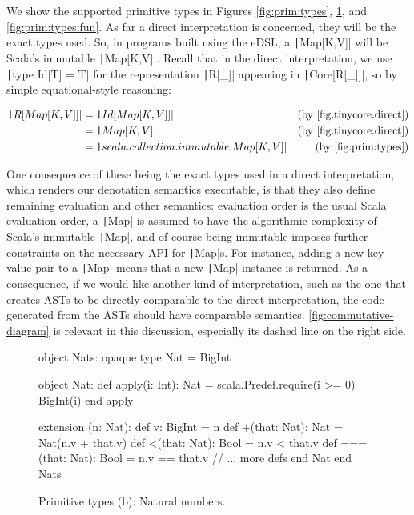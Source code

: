 \documentclass[11pt]{article}
\renewcommand{\vref}[1]{\autoref{#1} \vpageref{#1}}{}
\newcommand{\ScalaI}[1]{\texttt|#1|}
\begin{document}
We show the supported primitive types in Figures \ref{fig:prim:types}, 
\ref{fig:prim:types:nat}, and \ref{fig:prim:types:fun}.
As far a direct interpretation is concerned, they will be the exact types 
used. So, in programs built using the eDSL, a \ScalaI{Map[K,V]} will be 
Scala's immutable \ScalaI{Map[K,V]}. Recall that in the direct 
interpretation, we use \ScalaI{type Id[T] = T} for the representation 
\ScalaI{R[_]} appearing in \ScalaI{Core[R[_]]}, so by simple equational-style 
reasoning:
    
\begin{align*}
  \ScalaI{R[Map[K, V]]} &= \ScalaI{Id[Map[K, V]]} &%
      \text{(by \autoref{fig:tinycore:direct})}   \\
                        &= \ScalaI{Map[K, V]}     &%
      \text{(by \autoref{fig:tinycore:direct})}   \\
                        &= \ScalaI{scala.collection.immutable.Map[K, V]} &%
      \text{(by \autoref{fig:prim:types})}
\end{align*}

One consequence of these being the exact types used in a direct 
interpretation, which renders our denotation semantics executable, is that 
they also define remaining evaluation and other semantics: evaluation order 
is the usual Scala evaluation order, a \ScalaI{Map} is assumed to have the 
algorithmic complexity of Scala's immutable \ScalaI{Map}, and of course being 
immutable imposes further constraints on the necessary API for \ScalaI{Map}s. 
For instance, adding a new key-value pair to a \ScalaI{Map} means that a new 
\ScalaI{Map} instance is returned. As a consequence, if we would like another 
kind of interpretation, such as the one that creates ASTs to be directly 
comparable to the direct interpretation, the code generated from the ASTs 
should have comparable semantics. \vref{fig:commutative-diagram} is relevant 
in this discussion, especially its dashed line on the right side.

\begin{figure}[t]
\begin{ScalaBlock}
object Nats:
  opaque type Nat = BigInt

  object Nat:
    def apply(i: Int): Nat =
      scala.Predef.require(i >= 0)
      BigInt(i)
    end apply
    
    extension (n: Nat):
      def v: BigInt = n
      def +(that: Nat): Nat = Nat(n.v + that.v)
      def <(that: Nat): Bool = n.v < that.v
      def ===(that: Nat): Bool = n.v == that.v
      // ... more defs 
  end Nat
end Nats
\end{ScalaBlock}
\caption{Primitive types (b): Natural numbers.}
\label{fig:prim:types:nat}
\hrulefill
\end{figure}
\end{document}
